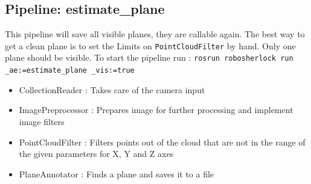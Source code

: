 \documentclass[main.tex]{subfiles}
\begin{document}
            \subsection{Pipeline: estimate\_plane}
This pipeline will save all visible planes, they are callable again. The best way to get a clean plane is to set the Limits on \texttt{PointCloudFilter} by hand. Only one plane should be visible. To start the pipeline run : \texttt{rosrun robosherlock run \_ae:=estimate\_plane \_vis:=true} 
\begin{itemize}
    \item CollectionReader : Takes care of the camera input
    \item ImagePreprocessor : Prepares image for further processing and implement image filters  
    \item PointCloudFilter : Filters points out of the cloud that are not in the range of the given parameters for X, Y and Z axes
    \item PlaneAnnotator : Finds a plane and saves it to a file 
\end{itemize}
\end{document}
